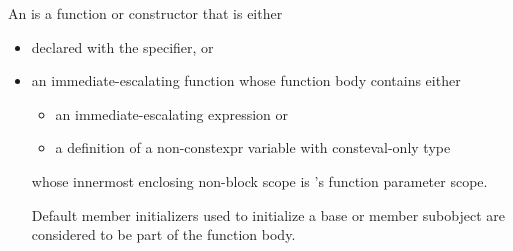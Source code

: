 \pnum
An  is a function or constructor that is either
\begin{itemize}
\item
declared with the  specifier, or
\item
an immediate-escalating function 
whose function body contains either
\begin{itemize}
\item an immediate-escalating expression or
\item a definition of a non-constexpr variable with consteval-only type
\end{itemize}
whose innermost enclosing non-block scope
is 's function parameter scope.
\begin{tailnote}
Default member initializers used to initialize
a base or member subobject
are considered to be part of the function body.
\end{tailnote}
\end{itemize}
